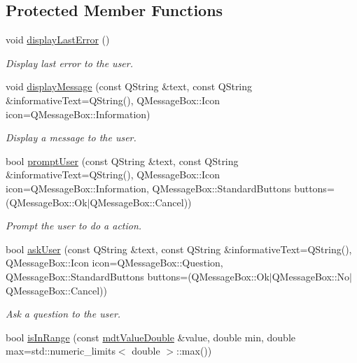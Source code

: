 \subsection*{Protected Member Functions}
\begin{DoxyCompactItemize}
\item 
void \hyperlink{classmdt_tt_abstract_test_node_calibration_tool_a4b1c2b5340a0352dde18bf838b378334}{display\-Last\-Error} ()
\begin{DoxyCompactList}\small\item\em Display last error to the user. \end{DoxyCompactList}\item 
void \hyperlink{classmdt_tt_abstract_test_node_calibration_tool_ad5c0a41531d0dbd9c774f59a72664687}{display\-Message} (const Q\-String \&text, const Q\-String \&informative\-Text=Q\-String(), Q\-Message\-Box\-::\-Icon icon=Q\-Message\-Box\-::\-Information)
\begin{DoxyCompactList}\small\item\em Display a message to the user. \end{DoxyCompactList}\item 
bool \hyperlink{classmdt_tt_abstract_test_node_calibration_tool_aaff76264fab90c51317d5491c448ba92}{prompt\-User} (const Q\-String \&text, const Q\-String \&informative\-Text=Q\-String(), Q\-Message\-Box\-::\-Icon icon=Q\-Message\-Box\-::\-Information, Q\-Message\-Box\-::\-Standard\-Buttons buttons=(Q\-Message\-Box\-::\-Ok$\vert$Q\-Message\-Box\-::\-Cancel))
\begin{DoxyCompactList}\small\item\em Prompt the user to do a action. \end{DoxyCompactList}\item 
bool \hyperlink{classmdt_tt_abstract_test_node_calibration_tool_a464c96ebdb95c0a43fc6684b2b3900f7}{ask\-User} (const Q\-String \&text, const Q\-String \&informative\-Text=Q\-String(), Q\-Message\-Box\-::\-Icon icon=Q\-Message\-Box\-::\-Question, Q\-Message\-Box\-::\-Standard\-Buttons buttons=(Q\-Message\-Box\-::\-Ok$\vert$Q\-Message\-Box\-::\-No$\vert$Q\-Message\-Box\-::\-Cancel))
\begin{DoxyCompactList}\small\item\em Ask a question to the user. \end{DoxyCompactList}\item 
bool \hyperlink{classmdt_tt_abstract_test_node_calibration_tool_ad49c3e8d02a45dd488292612bc492ec6}{is\-In\-Range} (const \hyperlink{classmdt_value_double}{mdt\-Value\-Double} \&value, double min, double max=std\-::numeric\-\_\-limits$<$ double $>$\-::max())

\end{DoxyCompactItemize}
